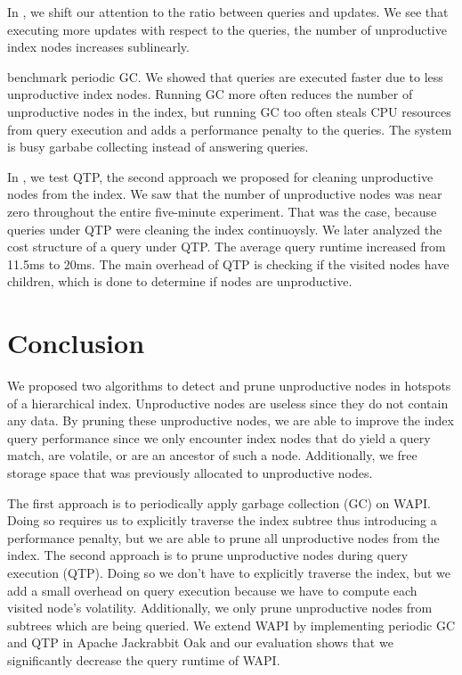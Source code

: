 \documentclass[abstracton,12pt]{scrartcl}
\theoremstyle{definition}
\begin{document}
In , we shift our attention to the ratio between
queries and updates. We see that executing more updates with respect
to the queries, the number of unproductive index nodes increases sublinearly.

 benchmark periodic GC. We showed
that queries are executed faster due to less unproductive index nodes.
Running GC more often reduces the number of unproductive nodes in the index,
but running GC too often steals CPU resources from query execution and
adds a performance penalty to the queries. The system is busy garbabe
collecting instead of answering queries.

In , we test QTP, the second approach we
proposed for cleaning unproductive nodes from the index. We saw that
the number of unproductive nodes was near zero throughout the entire
five-minute experiment. That was the case, because queries under
QTP were cleaning the index continuoysly. We later analyzed the
cost structure of a query under QTP. The average query runtime increased
from 11.5ms to 20ms. The main overhead of QTP is checking if the visited
nodes have children, which is done to determine if nodes are unproductive.

\newpage\null\thispagestyle{empty}\newpage

\section{Conclusion}

We proposed two algorithms to detect and prune unproductive nodes in hotspots of a
hierarchical index. Unproductive nodes are useless since they do not contain any data.
By pruning these unproductive nodes, we are able to improve the
index query performance since we only encounter index nodes that do yield a
query match, are volatile, or are an ancestor of such a node.
Additionally, we free storage space that was previously allocated to unproductive nodes.

The first approach is to periodically apply garbage collection (GC) on WAPI. Doing so
requires us to explicitly traverse the index subtree thus introducing a performance penalty,
but we are able to prune all unproductive nodes from the index.
The second approach is to prune unproductive nodes during query execution (QTP). Doing so we
don't have to explicitly traverse the index, but we add a small overhead on query execution
because we have to compute each visited node's volatility.
Additionally, we only prune unproductive nodes from subtrees which are being queried.
We extend WAPI by implementing periodic GC and QTP in Apache Jackrabbit Oak
and our evaluation shows that we significantly decrease the query runtime of WAPI.
\end{document}
